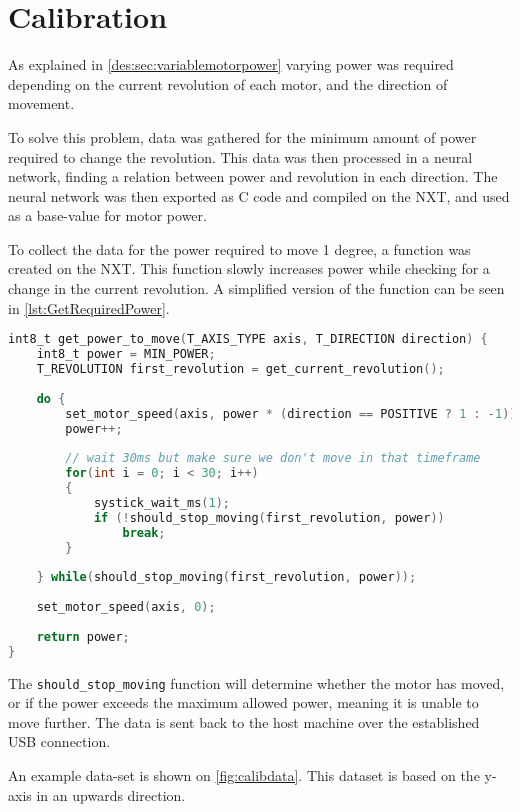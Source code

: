 \section{Calibration}\label{sec:calibration}
As explained in \autoref{des:sec:variablemotorpower} varying power was required depending on the current revolution of each motor, and the direction of movement.

To solve this problem, data was gathered for the minimum amount of power required to change the revolution.
This data was then processed in a neural network, finding a relation between power and revolution in each direction.
The neural network was then exported as C code and compiled on the NXT, and used as a base-value for motor power.

To collect the data for the power required to move 1 degree, a function was created on the NXT.
This function slowly increases power while checking for a change in the current revolution. 
A simplified version of the function can be seen in \autoref{lst:GetRequiredPower}.


\begin{lstlisting}[language=C,label={lst:GetRequiredPower},caption={Getting required power to move }]
int8_t get_power_to_move(T_AXIS_TYPE axis, T_DIRECTION direction) {
	int8_t power = MIN_POWER;
	T_REVOLUTION first_revolution = get_current_revolution();
	
	do {
		set_motor_speed(axis, power * (direction == POSITIVE ? 1 : -1));
		power++;
		
		// wait 30ms but make sure we don't move in that timeframe
		for(int i = 0; i < 30; i++)
		{
			systick_wait_ms(1);
			if (!should_stop_moving(first_revolution, power))
				break;
		}
	
	} while(should_stop_moving(first_revolution, power));
	
	set_motor_speed(axis, 0);
	
	return power;
}

\end{lstlisting}

The \texttt{should\_stop\_moving} function will determine whether the motor has moved, or if the power exceeds the maximum allowed power, meaning it is unable to move further.
The data is sent back to the host machine over the established USB connection.


An example data-set is shown on \autoref{fig:calibdata}.
This dataset is based on the y-axis in an upwards direction.


